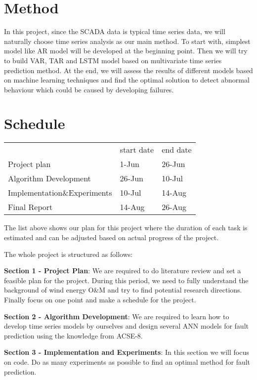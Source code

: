 \documentclass[english,a4paper,11pt]{article}
\begin{document}
\section{Method}
In this project, since the SCADA data is typical time series data, we will naturally choose time series analysis as our main method. To start with, simplest model like AR model will be developed at the beginning point. Then we will try to build VAR, TAR and LSTM model based on multivariate time series prediction method. At the end, we will assess the results of different models based on machine learning techniques and find the optimal solution to detect abnormal behaviour which could be caused by developing failures. 

\section{Schedule}

\begin{table}[h]
\begin{tabular}{lll}
                            & start date & end date \\
Project plan                & 1-Jun      & 26-Jun   \\
Algorithm  Development      & 26-Jun     & 10-Jul   \\
Implementation\&Experiments & 10-Jul     & 14-Aug   \\
Final Report                & 14-Aug     & 26-Aug  
\end{tabular}
\end{table}

The list above shows our plan for this project where the duration of each task is estimated and can be adjusted based on actual progress of the project. 

The whole project is structured as follows:

\textbf{Section 1 - Project Plan}: We are required to do literature review and set a feasible plan for the project. During this period, we need to fully understand the background of wind energy O\&M and try to find potential research directions. Finally focus on one point and make a schedule for the project.

\textbf{Section 2 - Algorithm Development}: We are required to learn how to develop time series models by ourselves and design several ANN models for fault prediction using the knowledge from ACSE-8.

\textbf{Section 3 - Implementation and Experiments}: In this section we will focus on code. Do as many experiments as possible to find an optimal method for fault prediction.
\end{document}
